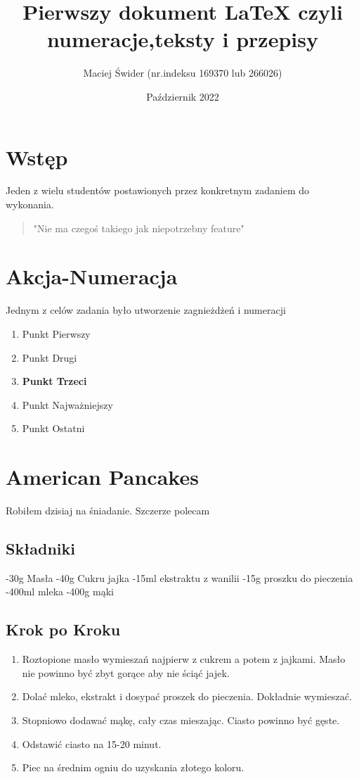 \documentclass[12pt, letterpaper, titlepage]{article}
\title{Pierwszy dokument LaTeX czyli numeracje,teksty i przepisy}
\author{Maciej Świder (nr.indeksu 169370 lub 266026)}
\date{Październik 2022}
\begin{document}
\maketitle
\section{Wstęp}
Jeden z wielu studentów postawionych przez konkretnym zadaniem do wykonania.
\begin{quote}
"Nie ma czegoś takiego jak niepotrzebny feature"
\end{quote}
\section{Akcja-Numeracja}
Jednym z celów zadania było utworzenie zagnieżdżeń i numeracji
\begin{enumerate}[I]
\item Punkt Pierwszy
\item Punkt Drugi
\color{red}
\item \textbf{Punkt Trzeci}
\color{black}
\item Punkt Najważniejszy
\item Punkt Ostatni
\end{enumerate}\newpage

\section{American Pancakes}
Robiłem dzisiaj na śniadanie. Szczerze polecam
\subsection{Składniki}
-30g Masła \newline
-40g Cukru  jajka \newline
-15ml ekstraktu z wanilii \newline
-15g proszku do pieczenia \newline
-400ml mleka \newline
-400g mąki \newline
\subsection{Krok po Kroku}
\begin{enumerate}

\item Roztopione masło wymieszań najpierw z cukrem a potem z jajkami. Masło nie powinno być zbyt gorące aby nie ściąć jajek.
\item Dolać mleko, ekstrakt i dosypać proszek do pieczenia. Dokładnie wymieszać.
\item Stopniowo dodawać mąkę, cały czas mieszając. Ciasto powinno być gęste.
\item Odstawić ciasto na 15-20 minut.
\item Piec na średnim ogniu do uzyskania złotego koloru.
\end{enumerate}
\end{document}
